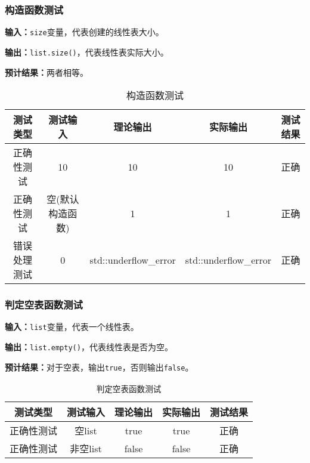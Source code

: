 \subsubsection{构造函数测试}
\textbf{输入：}\texttt{size}变量，代表创建的线性表大小。
\par
\textbf{输出：}\texttt{list.size()}，代表线性表实际大小。
\par
\textbf{预计结果：}两者相等。
\begin{table}[h]
\centering
\caption{构造函数测试}
\begin{tabular}{@{}ccccc@{}}
\toprule
\multicolumn{1}{c}{测试类型}    & \multicolumn{1}{c}{测试输入} & \multicolumn{1}{c}{理论输出} & \multicolumn{1}{c}{实际输出} & \multicolumn{1}{c}{测试结果} \\ \midrule
\multicolumn{1}{c|}{正确性测试}  & 10&10&10&正确\\
\multicolumn{1}{c|}{正确性测试}  & 空(默认构造函数)&1&1&正确\\
\multicolumn{1}{c|}{错误处理测试} & 0& std::underflow\_error& std::underflow\_error& 正确\\ \bottomrule
\end{tabular}
\label{tab:inittest1}
\end{table}

\subsubsection{判定空表函数测试}
\textbf{输入：}\texttt{list}变量，代表一个线性表。
\par
\textbf{输出：}\texttt{list.empty()}，代表线性表是否为空。
\par
\textbf{预计结果：}对于空表，输出\texttt{true}，否则输出\texttt{false}。
\begin{table}[h]
\centering
    \caption{\texttt{判定空表函数测试}}
\begin{tabular}{@{}ccccc@{}}
\toprule
\multicolumn{1}{c}{测试类型}    & \multicolumn{1}{c}{测试输入} & \multicolumn{1}{c}{理论输出} & \multicolumn{1}{c}{实际输出} & \multicolumn{1}{c}{测试结果} \\ \midrule
\multicolumn{1}{c|}{正确性测试}  & 空list&true&true&正确\\
\multicolumn{1}{c|}{正确性测试}  & 非空list&false&false&正确\\ \bottomrule
\end{tabular}
\label{tab:emptytest1}
\end{table}


